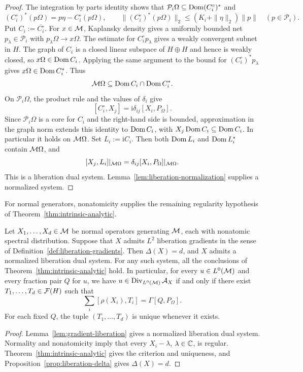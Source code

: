 \begin{proof}
The integration by parts identity shows that $\mathcal P_i\Omega\subseteq\operatorname{Dom}(C_i^\circ)^*$ and
\[
 (C_i^\circ)^*(p\Omega)=p\eta-C_i^\circ(p\Omega),\qquad
 \|(C_i^\circ)^*(p\Omega)\|_2\leq(K_i+\|\eta\|_2)\|p\|
 \quad(p\in\mathcal P_i).
\]
Put $C_i:=\overline{C_i^\circ}$.
For $x\in\mathcal M$, Kaplansky density \cite[Theorem~2.3.1]{AP18} gives a uniformly bounded net $p_\lambda\in\mathcal P_i$ with $p_\lambda\Omega\to x\Omega$.
The estimate for $C_i^\circ p_\lambda$ gives a weakly convergent subnet in $H$.
The graph of $C_i$ is a closed linear subspace of $H\oplus H$ and hence is weakly closed, so $x\Omega\in\operatorname{Dom} C_i$.
Applying the same argument to the bound for $(C_i^\circ)^*p_\lambda$ gives $x\Omega\in\operatorname{Dom} C_i^*$.
Thus
\[
 \mathcal M\Omega\subseteq\operatorname{Dom} C_i\cap\operatorname{Dom} C_i^*.
\]
On $\mathcal P_i\Omega$, the product rule and the values of $\delta_i$ give
\[
 [C_i^\circ,X_j]=\mathrm i\delta_{ij}[X_i,P_\Omega].
\]
Since $\mathcal P_i\Omega$ is a core for $C_i$ and the right-hand side is bounded, approximation in the graph norm extends this identity to $\operatorname{Dom} C_i$, with $X_j\operatorname{Dom} C_i\subseteq\operatorname{Dom} C_i$.
In particular it holds on $\mathcal M\Omega$.
Set $L_i:=\mathrm iC_i$.
Then both $\operatorname{Dom} L_i$ and $\operatorname{Dom} L_i^*$ contain $\mathcal M\Omega$, and
\[
 [X_j,L_i]|_{\mathcal M\Omega}=\delta_{ij}[X_i,P_\Omega]|_{\mathcal M\Omega}.
\]
This is a liberation dual system.
Lemma~\ref{lem:liberation-normalization} supplies a normalized system.
\end{proof}

For normal generators, nonatomicity supplies the remaining regularity hypothesis of Theorem~\ref{thm:intrinsic-analytic}.
\begin{proposition}\label{prop:liberation-gradients}
Let $X_1,\ldots,X_d\in\mathcal M$ be normal operators generating $\mathcal M$, each with nonatomic spectral distribution.
Suppose that $X$ admits $L^2$ liberation gradients in the sense of Definition~\ref{def:liberation-gradients}.
Then $\Delta(X)=d$, and $X$ admits a normalized liberation dual system.
For any such system, all the conclusions of Theorem~\ref{thm:intrinsic-analytic} hold.
In particular, for every $u\in L^0(\mathcal M)$ and every fraction pair $Q$ for $u$, we have $u\in\operatorname{Div}_{L^0(\mathcal M)}\mathcal A_X$ if and only if there exist $T_1,\ldots,T_d\in\mathcal F(H)$ such that
\[
 \sum_i[\rho(X_i),T_i]=\Gamma[Q,P_\Omega].
\]
For each fixed $Q$, the tuple $(T_1,\ldots,T_d)$ is unique whenever it exists.
\end{proposition}
\begin{proof}
Lemma~\ref{lem:gradient-liberation} gives a normalized liberation dual system.
Normality and nonatomicity imply that every $X_i-\lambda$, $\lambda\in\mathbb C$, is regular.
Theorem~\ref{thm:intrinsic-analytic} gives the criterion and uniqueness, and Proposition~\ref{prop:liberation-delta} gives $\Delta(X)=d$.
\end{proof}

